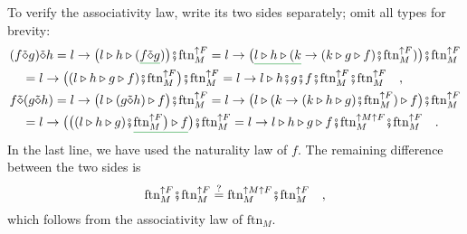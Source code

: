 To verify the associativity law, write its two sides separately; omit
all types for brevity:
\begin{align*}
 & (f\tilde{\diamond}g)\tilde{\diamond}h=l\rightarrow\big(l\triangleright h\triangleright(\gunderline{f\tilde{\diamond}g})\big)\bef\text{ftn}_{M}^{\uparrow F}=l\rightarrow\big(\gunderline{l\triangleright h\triangleright(k}\rightarrow(k\triangleright g\triangleright f)\bef\text{ftn}_{M}^{\uparrow F})\big)\bef\text{ftn}_{M}^{\uparrow F}\\
 & \quad=l\rightarrow\big((l\triangleright h\triangleright g\triangleright f)\bef\text{ftn}_{M}^{\uparrow F}\big)\bef\text{ftn}_{M}^{\uparrow F}=l\rightarrow l\triangleright h\bef g\bef f\bef\text{ftn}_{M}^{\uparrow F}\bef\text{ftn}_{M}^{\uparrow F}\quad,\\
 & f\tilde{\diamond}(g\tilde{\diamond}h)=l\rightarrow\big(l\triangleright(g\tilde{\diamond}h)\triangleright f\big)\bef\text{ftn}_{M}^{\uparrow F}=l\rightarrow\big(l\triangleright(k\rightarrow(k\triangleright h\triangleright g)\bef\text{ftn}_{M}^{\uparrow F})\triangleright f\big)\bef\text{ftn}_{M}^{\uparrow F}\\
 & \quad=l\rightarrow\big(\big((l\triangleright h\triangleright g)\bef\gunderline{\text{ftn}_{M}^{\uparrow F}\big)\triangleright f}\big)\bef\text{ftn}_{M}^{\uparrow F}=l\rightarrow l\triangleright h\triangleright g\triangleright f\bef\text{ftn}_{M}^{\uparrow M\uparrow F}\bef\text{ftn}_{M}^{\uparrow F}\quad.
\end{align*}
In the last line, we have used the naturality law of $f$. The remaining
difference between the two sides is
\[
\text{ftn}_{M}^{\uparrow F}\bef\text{ftn}_{M}^{\uparrow F}\overset{?}{=}\text{ftn}_{M}^{\uparrow M\uparrow F}\bef\text{ftn}_{M}^{\uparrow F}\quad,
\]
which follows from the associativity law of $\text{ftn}_{M}$.

